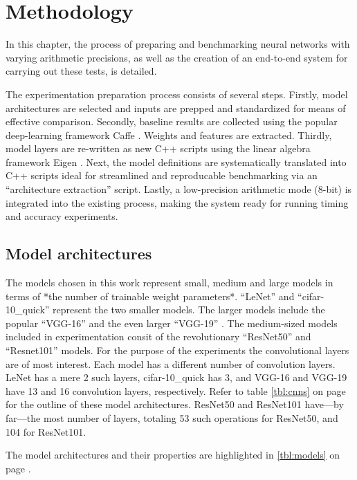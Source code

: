 \chapter{Methodology}

In this chapter, the process of preparing and benchmarking neural networks with varying arithmetic precisions, as well as the creation of an end-to-end system for carrying out these tests, is detailed.

The experimentation preparation process consists of several steps. Firstly, model architectures are selected and inputs are prepped and standardized for means of effective comparison. Secondly, baseline results are collected using the popular deep-learning framework Caffe \cite{caffe}. Weights and features are extracted. Thirdly, model layers are re-written as new C++ scripts using the linear algebra framework Eigen \cite{eigen}. Next, the model definitions are systematically translated into C++ scripts ideal for streamlined and reproducable benchmarking via an ``architecture extraction'' script. Lastly, a low-precision arithmetic mode (8-bit) is integrated into the existing process, making the system ready for running timing and accuracy experiments.

\section{Model architectures}
The models chosen in this work represent small, medium and large models in terms of *the number of trainable weight parameters*. ``LeNet'' \cite{mnist} and ``cifar-10\_quick'' \cite{cifar} represent the two smaller models. The larger models include the popular ``VGG-16'' and the even larger ``VGG-19'' \cite{return}. The medium-sized models included in experimentation consit of the revolutionary ``ResNet50'' and ``Resnet101'' \cite{resnets2} models. For the purpose of the experiments the convolutional layers are of most interest. Each model has a different number of convolution layers. LeNet has a mere 2 such layers, cifar-10\_quick has 3, and VGG-16 and VGG-19 have 13 and 16 convolution layers, respectively. Refer to table \ref{tbl:cnns} on page \pageref{tbl:cnns} for the outline of these model architectures. ResNet50 and ResNet101 have---by far---the most number of layers, totaling 53 such operations for ResNet50, and 104 for ResNet101.

The model architectures and their properties are highlighted in \ref{tbl:models} on page \pageref{tbl:models}.

